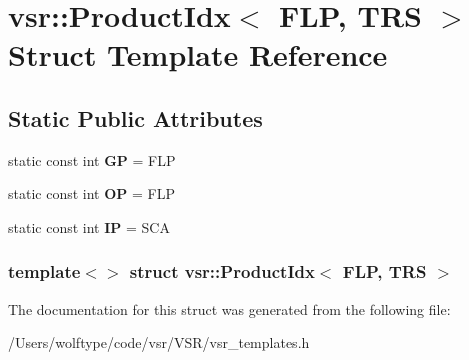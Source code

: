 \hypertarget{structvsr_1_1_product_idx_3_01_f_l_p_00_01_t_r_s_01_4}{\section{vsr\-:\-:Product\-Idx$<$ F\-L\-P, T\-R\-S $>$ Struct Template Reference}
\label{structvsr_1_1_product_idx_3_01_f_l_p_00_01_t_r_s_01_4}
}
\subsection*{Static Public Attributes}
\begin{DoxyCompactItemize}
\item 
\hypertarget{structvsr_1_1_product_idx_3_01_f_l_p_00_01_t_r_s_01_4_adfacbc78db6383385636c17547ba50f5}{static const int {\bfseries G\-P} = F\-L\-P}\label{structvsr_1_1_product_idx_3_01_f_l_p_00_01_t_r_s_01_4_adfacbc78db6383385636c17547ba50f5}

\item 
\hypertarget{structvsr_1_1_product_idx_3_01_f_l_p_00_01_t_r_s_01_4_a34d9bcfd0c048bc702f65aa62e5780b1}{static const int {\bfseries O\-P} = F\-L\-P}\label{structvsr_1_1_product_idx_3_01_f_l_p_00_01_t_r_s_01_4_a34d9bcfd0c048bc702f65aa62e5780b1}

\item 
\hypertarget{structvsr_1_1_product_idx_3_01_f_l_p_00_01_t_r_s_01_4_a0cb04e550fda06adfe223bdc8c03416b}{static const int {\bfseries I\-P} = S\-C\-A}\label{structvsr_1_1_product_idx_3_01_f_l_p_00_01_t_r_s_01_4_a0cb04e550fda06adfe223bdc8c03416b}

\end{DoxyCompactItemize}
\subsubsection*{template$<$$>$ struct vsr\-::\-Product\-Idx$<$ F\-L\-P, T\-R\-S $>$}



The documentation for this struct was generated from the following file\-:\begin{DoxyCompactItemize}
\item 
/\-Users/wolftype/code/vsr/\-V\-S\-R/vsr\-\_\-templates.\-h\end{DoxyCompactItemize}
